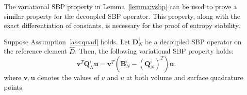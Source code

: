 \documentclass[review]{siamart0216}
\theoremstyle{assumption}
\renewcommand{\hat}[1]{\hat{#1}}
\newcommand{\LRp}[1]{\left( #1 \right)}
\newcommand{\LRl}[1]{\left. #1 \right|}
\renewcommand{\hat}{\widehat}
\newcommand{\note}[1]{{\color{blue}{#1}}}
\begin{document}
The variational SBP property in Lemma~\ref{lemma:vsbp} can be used to prove a similar property for the decoupled SBP operator.  This property, along with the exact differentiation of constants, is necessary for the proof of entropy stability.  
\begin{lemma}
Suppose Assumption~\ref{ass:quad} holds.  Let $\bm{D}^i_N$ be a decoupled SBP operator on the reference element $\hat{D}$.  
Then, the following variational SBP property holds:
\[
\bm{v}^T\bm{Q}^i_N\bm{u} = \bm{v}^T\LRp{\bm{B}^i_N - \LRp{\bm{Q}^i_N}^T}\bm{u}.%
\]
where $\bm{v}, \bm{u}$ denotes the values of $v$ and $u$ at both volume and surface quadrature points.  
\label{lemma:vdsbp}
\end{lemma}
\end{document}

